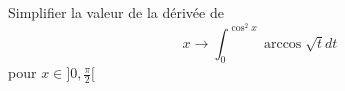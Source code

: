 Simplifier la valeur de la d\'eriv\'ee de \[x\rightarrow \int_0^{\cos^2 x}\arccos \sqrt{t}dt\] pour $x\in ]0,\frac{\pi}{2}[$\bigskip \bigskip